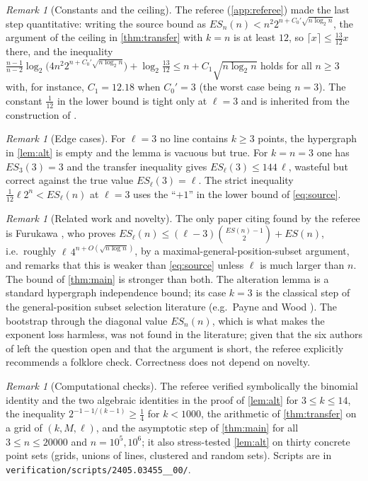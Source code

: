 \documentclass[11pt,a4paper]{article}
\theoremstyle{plain}
\theoremstyle{definition}
\theoremstyle{remark}
\newtheorem{remark}[theorem]{Remark}
\newcommand{\ES}{\mathit{ES}}
\begin{document}
\begin{remark}[Constants and the ceiling]\label{rem:const}
The referee (\cref{app:referee}) made the last step quantitative: writing the source bound as $\ES_n(n)<n^2 2^{n+C_0'\sqrt{n\log_2 n}}$, the argument of the ceiling in \cref{thm:transfer} with $k=n$ is at least $12$, so $\lceil x\rceil\le\frac{13}{12}x$ there, and the inequality $\frac{n-1}{n-2}\log_2\bigl(4n^2 2^{n+C_0'\sqrt{n\log_2 n}}\bigr)+\log_2\frac{13}{12}\le n+C_1\sqrt{n\log_2 n}$ holds for all $n\ge3$ with, for instance, $C_1=12.18$ when $C_0'=3$ (the worst case being $n=3$). The constant $\frac1{12}$ in the lower bound is tight only at $\ell=3$ and is inherited from the construction of \cite{CFHMSV}.
\end{remark}

\begin{remark}[Edge cases]
For $\ell=3$ no line contains $k\ge3$ points, the hypergraph in \cref{lem:alt} is empty and the lemma is vacuous but true. For $k=n=3$ one has $\ES_3(3)=3$ and the transfer inequality gives $\ES_\ell(3)\le144\,\ell$, wasteful but correct against the true value $\ES_\ell(3)=\ell$. The strict inequality $\frac1{12}\ell 2^n<\ES_\ell(n)$ at $\ell=3$ uses the ``$+1$'' in the lower bound of \eqref{eq:source}.
\end{remark}

\begin{remark}[Related work and novelty]
The only paper citing \cite{CFHMSV} found by the referee is Furukawa \cite{Furukawa25}, who proves $\ES_\ell(n)\le(\ell-3)\binom{\ES(n)-1}{2}+\ES(n)$, i.e.\ roughly $\ell\,4^{n+O(\sqrt{n\log n})}$, by a maximal-general-position-subset argument, and remarks that this is weaker than \eqref{eq:source} unless $\ell$ is much larger than $n$. The bound of \cref{thm:main} is stronger than both. The alteration lemma is a standard hypergraph independence bound; its case $k=3$ is the classical step of the general-position subset selection literature (e.g.\ Payne and Wood \cite{PW13}). The bootstrap through the diagonal value $\ES_n(n)$, which is what makes the exponent loss harmless, was not found in the literature; given that the six authors of \cite{CFHMSV} left the question open and that the argument is short, the referee explicitly recommends a folklore check. Correctness does not depend on novelty.
\end{remark}

\begin{remark}[Computational checks]
The referee verified symbolically the binomial identity and the two algebraic identities in the proof of \cref{lem:alt} for $3\le k\le14$, the inequality $2^{-1-1/(k-1)}\ge\frac14$ for $k<1000$, the arithmetic of \cref{thm:transfer} on a grid of $(k,M,\ell)$, and the asymptotic step of \cref{thm:main} for all $3\le n\le20000$ and $n=10^5,10^6$; it also stress-tested \cref{lem:alt} on thirty concrete point sets (grids, unions of lines, clustered and random sets). Scripts are in \texttt{verification/scripts/2405.03455\_\_00/}.
\end{remark}
\end{document}
